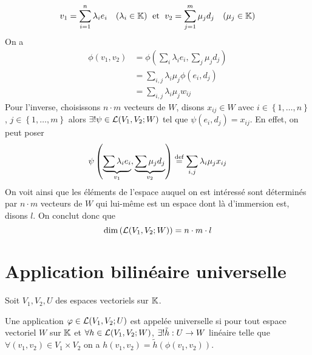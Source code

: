 $$v_1 = \sum_{i=1}^n \lambda_i e_i \quad (\lambda_i \in \mathbb{K}) \; \text{ et } \; v_2 = \sum_{j=1}^m \mu_j d_j \quad (\mu_j \in \mathbb{K})$$
On a
\begin{align*}
  \phi(v_1, v_2) &= \phi\left( \sum_{i} \lambda_i e_i, \sum_j \mu_j d_j \right) \\
                 &= \sum_{i, j} \lambda_i \mu_j \phi(e_i, d_j) \\
                 &= \sum_{i, j} \lambda_i \mu_j w_{ij}
\end{align*}
Pour l'inverse, choisissons $n\cdot m$ vecteurs de $W$, disons $x_{ij} \in W$ avec $i \in \left\{ 1, \dots, n \right\}$, $j \in \left\{ 1, \dots, m \right\}$ alors $\exists ! \psi \in \mathcal{L}(V_1, V_2; W)$ tel que $\psi(e_i, d_j) = x_{ij}$. En effet, on peut poser
$$\psi\left( \underbrace{\sum \lambda_i e_i}_{v_1}, \underbrace{\sum \mu_j d_j}_{v_2} \right) \stackrel{\text{def}}{=} \sum_{i,j} \lambda_i \mu_j x_{ij}$$
On voit ainsi que les éléments de l'espace auquel on est intéressé sont déterminés par $n\cdot m$ vecteurs de $W$ qui lui-même est un espace dont là d'immersion est, disons $l$. On conclut donc que
$$\dim\left( \mathcal{L}(V_1, V_2; W)\right) = n\cdot m \cdot l$$

\section{Application bilinéaire universelle}
Soit $V_1, V_2, U$ des espaces vectoriels sur $\mathbb{K}$.
\begin{definition}
  Une application $\varphi \in \mathcal{L}(V_1, V_2; U)$ est appelée universelle si pour tout espace vectoriel $W$ sur $\mathbb{K}$ et $\forall h \in \mathcal{L}(V_1, V_2; W)$, $\exists! \tilde{h}: U \rightarrow W$ linéaire telle que $\forall (v_1, v_2) \in V_1 \times V_2$ on a $h(v_1, v_2) = \tilde{h}(\phi(v_1, v_2))$.


\end{definition}
\begin{figure}[h]
  \centering
\end{figure}

